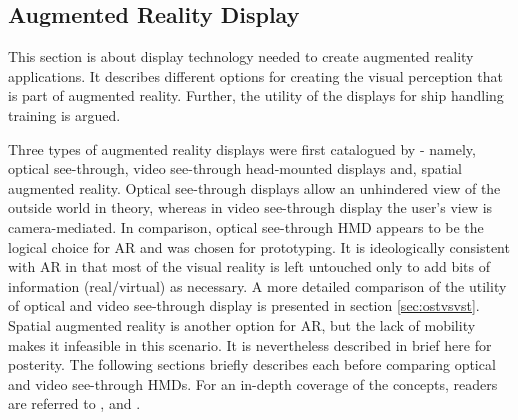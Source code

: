 %

\subsection{Augmented Reality Display}
This section is about display technology needed to create augmented reality applications. It describes different options for creating the visual perception that is part of augmented reality. Further, the utility of the displays for ship handling training is argued. 

Three types of augmented reality displays were first catalogued by \cite{azuma1997survey} - namely, optical see-through, video see-through head-mounted displays and, spatial augmented reality. Optical see-through displays allow an unhindered view of the outside world in theory, whereas in video see-through display the user's view is camera-mediated. In comparison, optical see-through HMD appears to be the logical choice for AR and was chosen for prototyping. It is ideologically consistent with AR in that most of the visual reality is left untouched only to add bits of information (real/virtual) as necessary. A more detailed comparison of the utility of optical and video see-through display is presented in section \ref{sec:ostvsvst}. Spatial augmented reality is another option for AR, but the lack of mobility makes it infeasible in this scenario. It is nevertheless described in brief here for posterity. The following sections briefly describes each before comparing optical and video see-through HMDs. For an in-depth coverage of the concepts, readers are referred to \cite{azuma1997survey}, \cite{azuma2001recent} and \cite{zhou2008trends}.

